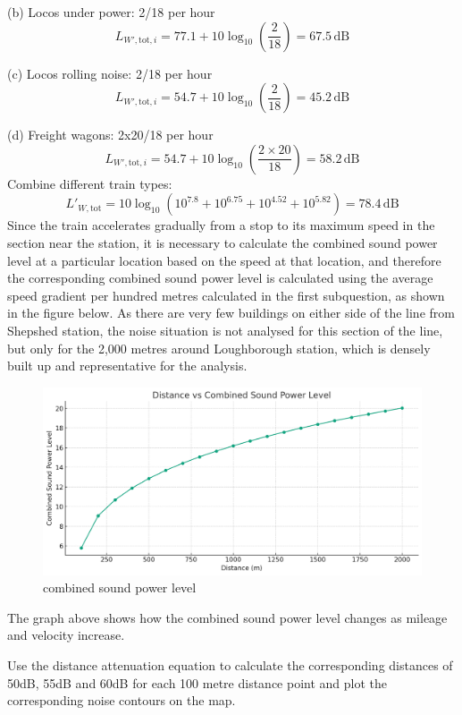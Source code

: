 \documentclass[letterpaper,12pt,leqno]{article}
\begin{document}
	(b) Locos under power: 2/18 per hour 
	$$L_{W', \text{tot}, i} = 77.1 + 10 \log_{10}\left(\frac{2}{18}\right) = 67.5 \, \text{dB}$$
	
	(c) Locos rolling noise: 2/18 per hour
	$$L_{W', \text{tot}, i} = 54.7 + 10 \log_{10}\left(\frac{2}{18}\right) = 45.2 \, \text{dB}$$
	
	(d) Freight wagons: 2x20/18 per hour
	$$L_{W', \text{tot}, i} = 54.7 + 10 \log_{10}\left(\frac{2\times 20}{18}\right) = 58.2 \, \text{dB}$$
	Combine different train types:
	$$L'_{W, \text{tot}} = 10 \log_{10} \left(10^{7.8} + 10^{6.75}+ 10^{4.52}+ 10^{5.82}\right) = 78.4 \, \text{dB}
	$$
	Since the train accelerates gradually from a stop to its maximum speed in the section near the station, it is necessary to calculate the combined sound power level at a particular location based on the speed at that location, and therefore the corresponding combined sound power level is calculated using the average speed gradient per hundred metres calculated in the first subquestion, as shown in the figure below. As there are very few buildings on either side of the line from Shepshed station, the noise situation is not analysed for this section of the line, but only for the 2,000 metres around Loughborough station, which is densely built up and representative for the analysis.
	\begin{figure}[H]
		\centering
		\includegraphics[width=\linewidth]{mspl}
		\caption{combined sound power level}
		\label{fig:mspl}
	\end{figure}
	
	The graph above shows how the combined sound power level changes as mileage and velocity increase.
	
	Use the distance attenuation equation to calculate the corresponding distances of 50dB, 55dB and 60dB for each 100 metre distance point and plot the corresponding noise contours on the map.
	
\end{document}
